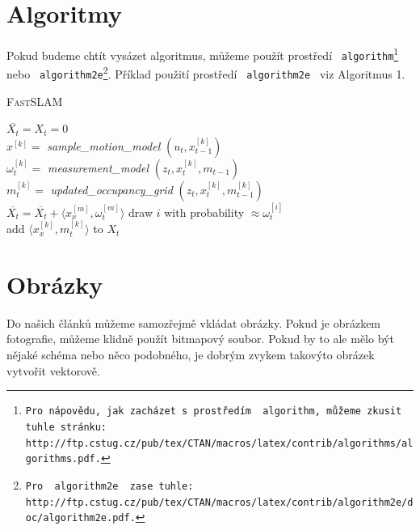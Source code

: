 \documentclass[a4paper, 11pt]{article}
\begin{document}
\section{Algoritmy}
\label{Alg}
Pokud budeme chtít vysázet algoritmus, můžeme použít prostředí \texttt{ algorithm\footnote{Pro nápovědu, jak zacházet s prostředím \texttt{ algorithm}, můžeme zkusit tuhle stránku:\\
http://ftp.cstug.cz/pub/tex/CTAN/macros/latex/contrib/algorithms/algorithms.pdf.} } nebo \texttt{ algorithm2e\footnote{Pro \texttt{ algorithm2e } zase tuhle: http://ftp.cstug.cz/pub/tex/CTAN/macros/latex/contrib/algorithm2e/doc/algorithm2e.pdf.}}.
Příklad použití prostředí \texttt{ algorithm2e } viz Algoritmus 1.
\bigskip
\begin{algorithm}
\caption{\textsc{FastSLAM}}
\label{fastSLAM_alg}
\SetNlSkip{-1em}
\SetInd{1em}{0em}
\SetNlSty{}{}{:}
\BlankLine
\Indp
\Indpp
$\overline{X_t} = X_t = 0$\\
{
    $x^{[k]} = $ \emph{sample\_motion\_model} $(u_t, x_{t-1}^{[k]})$\\
    $\omega_{t}^{[k]} = $ \emph{measurement\_model} $(z_{t},x_{t}^{[k]},m_{t-1})$\\
    $m_{t}^{[k]} = $ \emph{updated\_occupancy\_grid} $(z_{t},x_{t}^{[k]},m_{t-1}^{[k]})$\\
    $\overline{X_t} = \overline{X_t} + \langle x_{x}^{[m]},\omega_{t}^{[m]} \rangle$
}
{
    draw $i$ with probability $\approx \omega_{t}^{[i]}$\\
    add $\langle x_{x}^{[k]},m_{t}^{[k]}\rangle$ to $X_t$
}
\end{algorithm}

\section{Obrázky}
Do našich článků můžeme samozřejmě vkládat obrázky. Pokud je obrázkem fotografie, můžeme klidně použít
bitmapový soubor. Pokud by to ale mělo být nějaké schéma nebo něco podobného, je dobrým zvykem takovýto
obrázek vytvořit vektorově.
\end{document}
